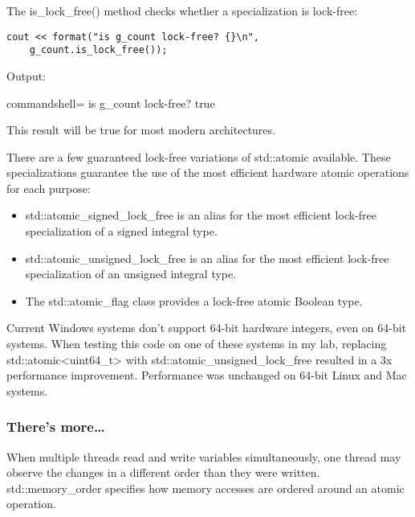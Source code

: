 The is\_lock\_free() method checks whether a specialization is lock-free:

\begin{lstlisting}[style=styleCXX]
cout << format("is g_count lock-free? {}\n",
	g_count.is_lock_free());
\end{lstlisting}

Output:

\begin{tcblisting}{commandshell={}}
is g_count lock-free? true
\end{tcblisting}

This result will be true for most modern architectures.

There are a few guaranteed lock-free variations of std::atomic available. These specializations guarantee the use of the most efficient hardware atomic operations for each purpose:

\begin{itemize}
\item 
std::atomic\_signed\_lock\_free is an alias for the most efficient lock-free specialization of a signed integral type.

\item 
std::atomic\_unsigned\_lock\_free is an alias for the most efficient lock-free specialization of an unsigned integral type.

\item 
The std::atomic\_flag class provides a lock-free atomic Boolean type.
\end{itemize}

\begin{tcolorbox}[colback=webgreen!5!white,colframe=webgreen!75!black,title=Important Note]
Current Windows systems don't support 64-bit hardware integers, even on 64-bit systems. When testing this code on one of these systems in my lab, replacing std::atomic<uint64\_t> with std::atomic\_unsigned\_lock\_free resulted in a 3x performance improvement. Performance was unchanged on 64-bit Linux and Mac systems.
\end{tcolorbox}

\subsubsection{There's more…}

When multiple threads read and write variables simultaneously, one thread may observe the changes in a different order than they were written. std::memory\_order specifies how memory accesses are ordered around an atomic operation.

